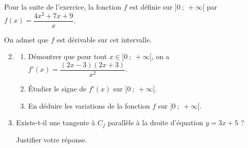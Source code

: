 \documentclass[10pt]{article}
\begin{document}
Pour la suite de l'exercice, la fonction $f$ est définie sur $]0\ ;\ +\infty[$ par $f(x)=\dfrac{4x^2+7x+9}{x}$.

On admet que $f$ est dérivable sur cet intervalle.

\begin{enumerate}
\setcounter{enumi}{1}
\item \begin{enumerate}
\item Démontrer que pour tout $x\in]0\ ;\ +\infty[$, on a $f'(x)=\dfrac{(2x-3)(2x+3)}{x^2}$.
\item Étudier le signe de $f'(x)$ sur $]0\ ;\ +\infty[$.
\item En déduire les variations de la fonction $f$ sur $]0\ ;\ +\infty[$.
\end{enumerate}
\item Existe-t-il une tangente à $C_f$ parallèle à la droite d'équation $y=3x+5$ ?

Justifier votre réponse.
\end{enumerate}
\end{document}
